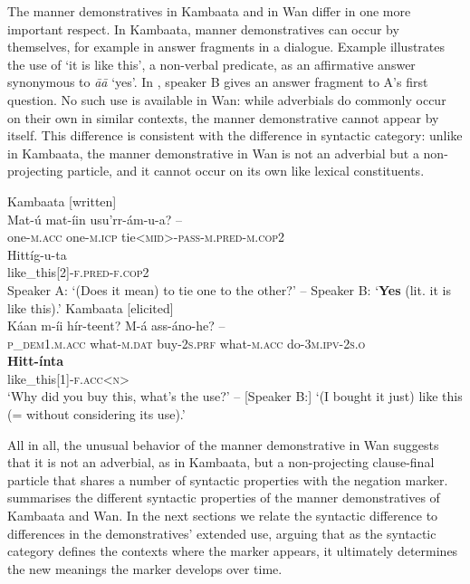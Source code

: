 \documentclass[output=paper,colorlinks,citecolor=brown]{langscibook}
\begin{document}
The manner demonstratives in Kambaata and in Wan differ in one more important respect. In Kambaata, manner demonstratives can occur by themselves, for example in answer fragments in a dialogue. Example  illustrates the use of ‘it is like this’, a non-verbal predicate, as an affirmative answer synonymous to \textit{āā} ‘yes’. In , speaker B gives an answer fragment to A’s first question. No such use is available in Wan: while adverbials do commonly occur on their own in similar contexts, the manner demonstrative cannot appear by itself. This difference is consistent with the difference in syntactic category: unlike in Kambaata, the manner demonstrative in Wan is not an adverbial but a non-projecting particle, and it cannot occur on its own like lexical constituents.

\ea\label{ex:nikitina:14}
\ea\label{ex:nikitina:14a} {Kambaata [written]}\\
\gll Mat-ú mat-íin usu’rr-ám-u-a?  –\\
     one-\textsc{m.acc} one-\textsc{m.icp} tie<\textsc{mid}>-\textsc{pass}{}-\textsc{m.pred}{}-\textsc{m.cop2}\\
\gll Hittíg-u-ta\\
     like\_this[2]\textsc{{}-f.pred-f.cop2}\\
\glt Speaker A: ‘(Does it mean) to tie one to the other?’ – Speaker B: ‘\textbf{Yes} (lit. it is like this).’ 
\ex\label{ex:nikitina:14b} {Kambaata [elicited]}\\
\gll Káan m-íi hír-teent? M-á ass-áno-he? –\\
     \textsc{p\_dem1.m.acc} what-\textsc{m.dat} buy-\textsc{2s.prf} what-\textsc{m.acc} do-\textsc{3m.ipv-2s.o}\\
\gll \textbf{Hitt-ínta}\\
     like\_this[1]\textsc{{}-f.acc<n>}\\
\glt [Speaker A:] ‘Why did you buy this, what’s the use?’ – [Speaker B:] ‘(I bought it just) like this (= without considering its use).’ 
\z
\z

All in all, the unusual behavior of the manner demonstrative in Wan suggests that it is not an adverbial, as in Kambaata, but a non-projecting clause-final particle that shares a number of syntactic properties with the negation marker.  summarises the different syntactic properties of the manner demonstratives of Kambaata and Wan. In the next sections we relate the syntactic difference to differences in the demonstratives’ extended use, arguing that as the syntactic category defines the contexts where the marker appears, it ultimately determines the new meanings the marker develops over time.
\end{document}
